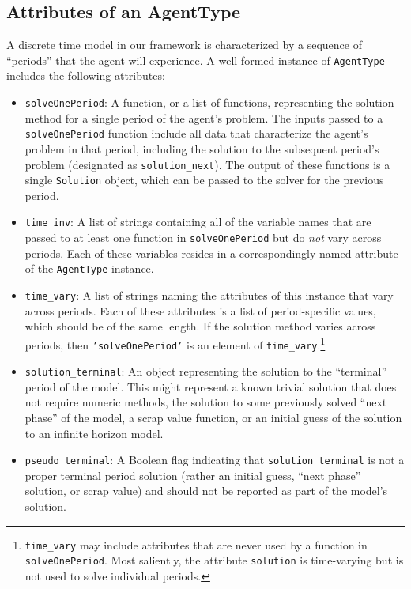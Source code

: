 \documentclass[12pt,titlepage,letterpaper]{econtex}
\begin{document}
{\subsection{Attributes of an AgentType}\label{sec:AttributesOfAnAgentType}

A discrete time model in our framework is characterized by a sequence of ``periods'' that the agent will experience.  A well-formed instance of \texttt{AgentType} includes the following attributes:
\begin{itemize}
\item \texttt{solveOnePeriod}: A function, or a list of functions, representing the solution method for a single period of the agent's problem.  The inputs passed to a \texttt{solveOnePeriod} function include all data that characterize the agent's problem in that period, including the solution to the subsequent period's problem (designated as \texttt{solution\_next}).  The output of these functions is a single \texttt{Solution} object, which can be passed to the solver for the previous period.

\item \texttt{time\_inv}: A list of strings containing all of the variable names that are passed to at least one function in \texttt{solveOnePeriod} but do \textit{not} vary across periods.  Each of these variables resides in a correspondingly named attribute of the \texttt{AgentType} instance.

\item \texttt{time\_vary}: A list of strings naming the attributes of this instance that vary across periods.  Each of these attributes is a list of period-specific values, which should be of the same length.  If the solution method varies across periods, then \texttt{'solveOnePeriod'} is an element of \texttt{time\_vary}.\footnote{\texttt{time\_vary} may include attributes that are never used by a function in \texttt{solveOnePeriod}.  Most saliently, the attribute \texttt{solution} is time-varying but is not used to solve individual periods.}

\item \texttt{solution\_terminal}: An object representing the solution to the ``terminal'' period of the model.  This might represent a known trivial solution that does not require numeric methods, the solution to some previously solved ``next phase'' of the model, a scrap value function, or an initial guess of the solution to an infinite horizon model.

\item \texttt{pseudo\_terminal}: A Boolean flag indicating that \texttt{solution\_terminal} is not a proper terminal period solution (rather an initial guess, ``next phase'' solution, or scrap value) and should not be reported as part of the model's solution.


\end{itemize}}
\end{document}
